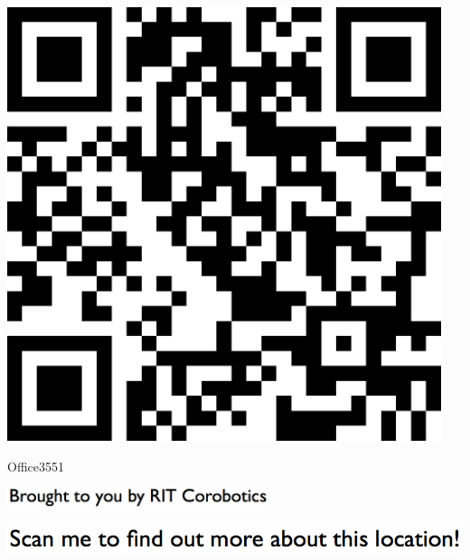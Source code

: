 \documentclass[letterpaper]{article}
\begin{document}
 \begingroup 
 \centerline{\includegraphics[scale=1,width=5in,height=5in]{Office3551.png}} 
 \endgroup 
 \vspace*{\fill} 

 \hfill{\small Office3551} 

  \vspace{0.7in} 
 
 \centerline{\includegraphics[scale=1,width=3in]{text-bottom.png}} 
 
 \pagebreak 
{} 
 \vspace*{\fill} 
 
  \centerline{\includegraphics[scale=1,width=6in]{text-top.png}} 
 
 \vspace{0.5in} 
 
\end{document}
